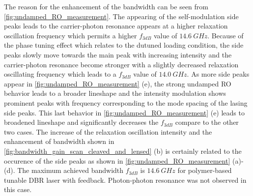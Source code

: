 The reason for the enhancement of the bandwidth can be seen from \autoref{fig:undamped_RO_measurement}. The appearing of the self-modulation side peaks leads to the carrier-photon resonance appears at a higher relaxation oscillation frequency which permits a higher $f_{3dB}$ value of $14.6 \ GHz$. Because of the phase tuning effect which relates to the dutuned loading condition, the side peaks slowly move towards the main peak with increasing intensity and the carrier-photon resonance become stronger with a slightly decreased relaxation oscillating frequency which leads to a $f_{3dB}$ value of $14.0 \ GHz$. As more side peaks appear in \autoref{fig:undamped_RO_measurement} (e), the strong undamped RO behavior leads to a broader lineshape and the intensity modulation shows prominent peaks with frequency corresponding to the mode spacing of the lasing side peaks. This last behavior in \autoref{fig:undamped_RO_measurement} (e) leads to broadened lineshape and significantly decreases the $f_{3dB}$ compare to the other two cases. The increase of the relaxation oscillation intensity and the enhancement of bandwidth shown in \autoref{fig:bandwidth_gain_scan_cleaved_and_lensed} (b) is certainly related to the occurence of the side peaks as shown in \autoref{fig:undamped_RO_measurement} (a)-(d). The maximum achieved bandwidth $f_{3dB}$ is $14.6 \ GHz$ for polymer-based tunable DBR laser with feedback. Photon-photon resonance was not observed in this case.







